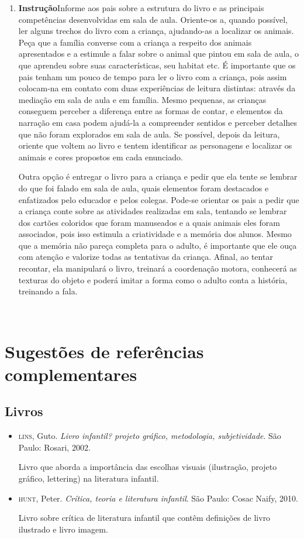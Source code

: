 \documentclass[11pt]{extarticle}
\begin{document}
\begin{enumerate}
\item \textbf{Instrução}\quad Informe aos pais sobre a estrutura do livro e as principais competências desenvolvidas em sala de aula.
Oriente-os a, quando possível, ler alguns trechos do livro com a criança, ajudando-as a localizar os animais.
Peça que a família converse com a criança a respeito dos animais apresentados e a estimule a falar sobre o animal que pintou em sala de aula, o que aprendeu sobre suas características, seu habitat etc. 
É importante que os pais tenham um pouco de tempo para ler o livro com a criança, pois assim
colocam-na em contato com duas experiências de leitura distintas: através da mediação em sala de aula e em família. 
Mesmo pequenas, as crianças conseguem perceber a diferença entre 
as formas de contar, e elementos da narração em casa podem ajudá-la a compreender 
sentidos e perceber detalhes que não foram explorados em sala de aula. Se possível, depois da leitura, oriente 
que voltem ao livro e tentem identificar as personagens e localizar os animais e cores propostos em cada enunciado.

Outra opção é entregar o livro para a criança e pedir que ela tente se lembrar
do que foi falado em sala de aula, quais elementos foram destacados e enfatizados pelo educador e pelos colegas. Pode-se orientar os pais a pedir que a criança conte sobre as atividades realizadas em sala, tentando se lembrar dos cartões coloridos que foram manuseados e a quais animais eles foram associados, pois isso estimula a criatividade e a memória dos alunos. Mesmo que a memória não pareça 
completa para o adulto, é importante que ele ouça com atenção e 
valorize todas as tentativas da criança. Afinal, ao tentar recontar, 
ela manipulará o livro, treinará a coordenação motora, conhecerá as texturas 
do objeto e poderá imitar a forma como o adulto 
conta a história, treinando a fala. 
\end{enumerate}

 
\section{Sugestões de referências complementares}

\subsection{Livros} 

\begin{itemize}
\item \textsc{lins}, Guto. \textit{Livro infantil? projeto gráfico, metodologia, subjetividade}. São Paulo: Rosari, 2002.

Livro que aborda a importância das escolhas visuais (ilustração, projeto gráfico, lettering) na literatura infantil.  

\item \textsc{hunt}, Peter. \textit{Crítica, teoria e literatura infantil}. São Paulo: Cosac Naify, 2010.

Livro sobre crítica de literatura infantil que contêm definições de livro ilustrado e livro imagem. 
\end{itemize}
\end{document}
